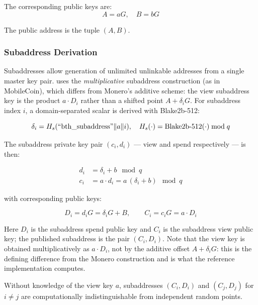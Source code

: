 The corresponding public keys are:
\begin{equation}
A = aG, \quad B = bG
\end{equation}

The public address is the tuple $(A, B)$.



\subsubsection{Subaddress Derivation}

Subaddresses allow generation of unlimited unlinkable addresses from a
single master key pair. \Botho uses the \emph{multiplicative} subaddress
construction (as in MobileCoin), which differs from Monero's additive
scheme: the view subaddress key is the product $a \cdot D_i$ rather than
a shifted point $A + \delta_i G$. For subaddress index $i$, a
domain-separated scalar is derived with Blake2b-512:

\begin{equation}
\delta_i = H_s(\text{``bth\_subaddress''} \| a \| i),
\quad H_s(\cdot) = \text{Blake2b-512}(\cdot) \bmod q
\end{equation}

The subaddress private key pair $(c_i, d_i)$ --- view and spend
respectively --- is then:

\begin{align}
d_i &= \delta_i + b \mod q \\
c_i &= a \cdot d_i = a\,(\delta_i + b) \mod q
\end{align}

with corresponding public keys:

\begin{equation}
D_i = d_i G = \delta_i G + B, \qquad C_i = c_i G = a \cdot D_i
\end{equation}

Here $D_i$ is the subaddress spend public key and $C_i$ is the
subaddress view public key; the published subaddress is the pair
$(C_i, D_i)$. Note that the view key is obtained multiplicatively as
$a \cdot D_i$, not by the additive offset $A + \delta_i G$: this is the
defining difference from the Monero construction and is what the
reference implementation computes.

\begin{theorem}
Without knowledge of the view key $a$, subaddresses $(C_i, D_i)$ and
$(C_j, D_j)$ for $i \neq j$ are computationally indistinguishable from
independent random points.
\end{theorem}

